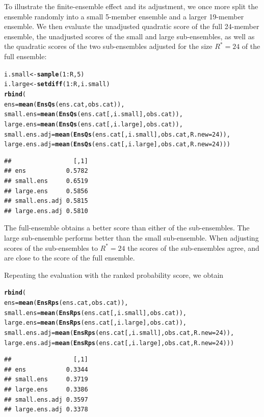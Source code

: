 \documentclass[article]{jss}\usepackage{graphicx, color}
\makeatletter
\newcommand{\hlfunctioncall}[1]{\textcolor[rgb]{0,0.501960784313725,0.752941176470588}{\textbf{#1}}}%
\newenvironment{kframe}{%
 \def\at@end@of@kframe{}%
 \ifinner\ifhmode%
  \def\at@end@of@kframe{\end{minipage}}%
  \begin{minipage}{\columnwidth}%
 \fi\fi%
 \def\FrameCommand##1{\hskip\@totalleftmargin \hskip-\fboxsep
 \colorbox{shadecolor}{##1}\hskip-\fboxsep
     \hskip-\linewidth \hskip-\@totalleftmargin \hskip\columnwidth}%
 \MakeFramed {\advance\hsize-\width
   \@totalleftmargin\z@ \linewidth\hsize
   \@setminipage}}%
 {\par\unskip\endMakeFramed%
 \at@end@of@kframe}
\newenvironment{knitrout}{}{} %
\makeatother
\begin{document}
To illustrate the finite-ensemble effect and its adjustment, we once more split the ensemble randomly into a small 5-member ensemble and a larger 19-member ensemble. 
We then evaluate the unadjusted quadratic score of the full 24-member ensemble, the unadjusted scores of the small and large sub-ensembles, as well as the quadratic scores of the two sub-ensembles adjusted for the size $R^*=24$ of the full ensemble:

\begin{knitrout}
\color{fgcolor}\begin{kframe}
\begin{alltt}
i.small <- \hlfunctioncall{sample}(1:R, 5)
i.large <- \hlfunctioncall{setdiff}(1:R, i.small)
\hlfunctioncall{rbind}(
ens           = \hlfunctioncall{mean}(\hlfunctioncall{EnsQs}(ens.cat,            obs.cat)),
small.ens     = \hlfunctioncall{mean}(\hlfunctioncall{EnsQs}(ens.cat[, i.small], obs.cat)),
large.ens     = \hlfunctioncall{mean}(\hlfunctioncall{EnsQs}(ens.cat[, i.large], obs.cat)),
small.ens.adj = \hlfunctioncall{mean}(\hlfunctioncall{EnsQs}(ens.cat[, i.small], obs.cat, R.new=24)),
large.ens.adj = \hlfunctioncall{mean}(\hlfunctioncall{EnsQs}(ens.cat[, i.large], obs.cat, R.new=24)))
\end{alltt}
\begin{verbatim}
##                 [,1]
## ens           0.5782
## small.ens     0.6519
## large.ens     0.5856
## small.ens.adj 0.5815
## large.ens.adj 0.5810
\end{verbatim}
\end{kframe}
\end{knitrout}


The full-ensemble obtains a better score than either of the sub-ensembles.
The large sub-ensemble performs better than the small sub-ensemble.
When adjusting scores of the sub-ensembles to $R^*=24$ the scores of the sub-ensembles agree, and are close to the score of the full ensemble.

Repeating the evaluation with the ranked probability score, we obtain

\begin{knitrout}
\color{fgcolor}\begin{kframe}
\begin{alltt}
\hlfunctioncall{rbind}(
ens           = \hlfunctioncall{mean}(\hlfunctioncall{EnsRps}(ens.cat,            obs.cat)),
small.ens     = \hlfunctioncall{mean}(\hlfunctioncall{EnsRps}(ens.cat[, i.small], obs.cat)),
large.ens     = \hlfunctioncall{mean}(\hlfunctioncall{EnsRps}(ens.cat[, i.large], obs.cat)),
small.ens.adj = \hlfunctioncall{mean}(\hlfunctioncall{EnsRps}(ens.cat[, i.small], obs.cat, R.new=24)),
large.ens.adj = \hlfunctioncall{mean}(\hlfunctioncall{EnsRps}(ens.cat[, i.large], obs.cat, R.new=24)))
\end{alltt}
\begin{verbatim}
##                 [,1]
## ens           0.3344
## small.ens     0.3719
## large.ens     0.3386
## small.ens.adj 0.3597
## large.ens.adj 0.3378
\end{verbatim}
\end{kframe}
\end{knitrout}
\end{document}
